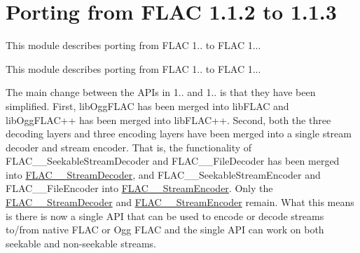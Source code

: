 \hypertarget{group__porting__1__1__2__to__1__1__3}{}\section{Porting from F\+L\+AC 1.1.2 to 1.1.3}
\label{group__porting__1__1__2__to__1__1__3}


This module describes porting from F\+L\+AC 1.. to F\+L\+AC 1...  


This module describes porting from F\+L\+AC 1.. to F\+L\+AC 1... 

The main change between the A\+P\+Is in 1.. and 1.. is that they have been simplified. First, lib\+Ogg\+F\+L\+AC has been merged into lib\+F\+L\+AC and lib\+Ogg\+F\+L\+A\+C++ has been merged into lib\+F\+L\+A\+C++. Second, both the three decoding layers and three encoding layers have been merged into a single stream decoder and stream encoder. That is, the functionality of F\+L\+A\+C\+\_\+\+\_\+\+Seekable\+Stream\+Decoder and F\+L\+A\+C\+\_\+\+\_\+\+File\+Decoder has been merged into \mbox{\hyperlink{struct_f_l_a_c_____stream_decoder}{F\+L\+A\+C\+\_\+\+\_\+\+Stream\+Decoder}}, and F\+L\+A\+C\+\_\+\+\_\+\+Seekable\+Stream\+Encoder and F\+L\+A\+C\+\_\+\+\_\+\+File\+Encoder into \mbox{\hyperlink{struct_f_l_a_c_____stream_encoder}{F\+L\+A\+C\+\_\+\+\_\+\+Stream\+Encoder}}. Only the \mbox{\hyperlink{struct_f_l_a_c_____stream_decoder}{F\+L\+A\+C\+\_\+\+\_\+\+Stream\+Decoder}} and \mbox{\hyperlink{struct_f_l_a_c_____stream_encoder}{F\+L\+A\+C\+\_\+\+\_\+\+Stream\+Encoder}} remain. What this means is there is now a single A\+PI that can be used to encode or decode streams to/from native F\+L\+AC or Ogg F\+L\+AC and the single A\+PI can work on both seekable and non-\/seekable streams.

